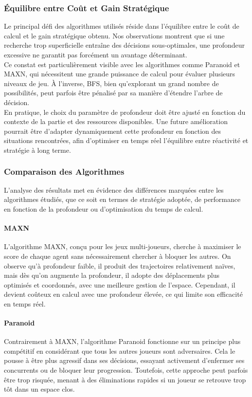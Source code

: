 \newpage

\subsubsection{Équilibre entre Coût et Gain Stratégique}
Le principal défi des algorithmes utilisés réside dans l’équilibre entre le coût de calcul et le gain stratégique obtenu. Nos observations montrent que si une recherche trop superficielle entraîne des décisions sous-optimales, une profondeur excessive ne garantit pas forcément un avantage déterminant. \\
Ce constat est particulièrement visible avec les algorithmes comme Paranoid et MAXN, qui nécessitent une grande puissance de calcul pour évaluer plusieurs niveaux de jeu. À l’inverse, BFS, bien qu’explorant un grand nombre de possibilités, peut parfois être pénalisé par sa manière d’étendre l’arbre de décision. \\
En pratique, le choix du paramètre de profondeur doit être ajusté en fonction du contexte de la partie et des ressources disponibles. Une future amélioration pourrait être d’adapter dynamiquement cette profondeur en fonction des situations rencontrées, afin d’optimiser en temps réel l’équilibre entre réactivité et stratégie à long terme.

\subsubsection{Comparaison des Algorithmes}
L’analyse des résultats met en évidence des différences marquées entre les algorithmes étudiés, que ce soit en termes de stratégie adoptée, de performance en fonction de la profondeur ou d’optimisation du temps de calcul.
\paragraph{MAXN}
L’algorithme MAXN, conçu pour les jeux multi-joueurs, cherche à maximiser le score de chaque agent sans nécessairement chercher à bloquer les autres. On observe qu’à profondeur faible, il produit des trajectoires relativement naïves, mais dès qu’on augmente la profondeur, il adopte des déplacements plus optimisés et coordonnés, avec une meilleure gestion de l’espace. Cependant, il devient coûteux en calcul avec une profondeur élevée, ce qui limite son efficacité en temps réel.
\paragraph{Paranoid}
Contrairement à MAXN, l’algorithme Paranoid fonctionne sur un principe plus compétitif en considérant que tous les autres joueurs sont adversaires. Cela le pousse à être plus agressif dans ses décisions, essayant activement d’enfermer ses concurrents ou de bloquer leur progression. Toutefois, cette approche peut parfois être trop risquée, menant à des éliminations rapides si un joueur se retrouve trop tôt dans un espace clos.
